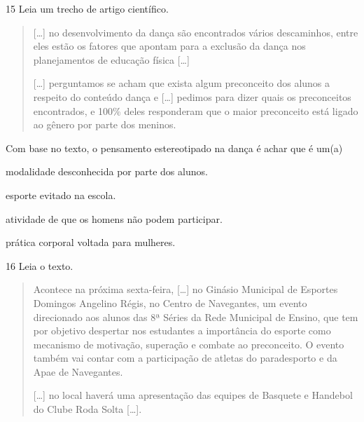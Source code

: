 \num{15} Leia um trecho de artigo científico.
\begin{quote}
  {[}\ldots{}{]} no desenvolvimento da dança são encontrados vários
  descaminhos, entre eles estão os fatores que apontam para a exclusão
  da dança nos planejamentos de educação física {[}\ldots{}{]}

{[}\ldots{}{]} perguntamos se acham que exista algum preconceito dos alunos a
respeito do conteúdo dança e {[}\ldots{}{]} pedimos para dizer quais os
preconceitos encontrados, e 100\% deles responderam que o maior
preconceito está ligado ao gênero por parte dos meninos.

\end{quote}

\noindent{}Com base no texto, o pensamento estereotipado na dança é achar que é um(a)

\begin{escolha}
\item modalidade desconhecida por parte dos alunos.

\item esporte evitado na escola.

\item atividade de que os homens não podem participar.

\item prática corporal voltada para mulheres.
\end{escolha}


\pagebreak
\num{16} Leia o texto.
\begin{quote}
  Acontece na próxima sexta-feira, {[}\ldots{}{]} no Ginásio Municipal de
  Esportes Domingos Angelino Régis, no Centro de Navegantes, um evento
  direcionado aos alunos das 8ª Séries da Rede Municipal de Ensino, que
  tem por objetivo despertar nos estudantes a importância do esporte
  como mecanismo de motivação, superação e combate ao preconceito. O
  evento também vai contar com a participação de atletas do paradesporto
  e da Apae de Navegantes.

{[}\ldots{}{]} no local haverá uma apresentação das equipes de Basquete e
Handebol do Clube Roda Solta {[}\ldots{}{]}.

\end{quote}

